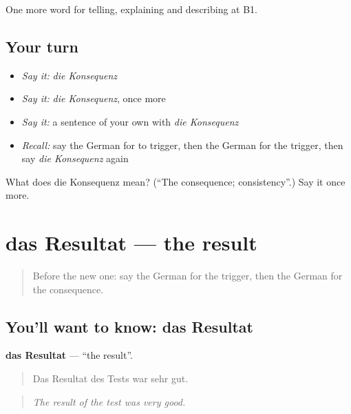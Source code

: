 \begin{grammarlens}[title={What you've built}]
One more word for telling, explaining and describing at B1.
\end{grammarlens}

\subsection*{Your turn}
\begin{itemize}
\raggedright
  \item \emph{Say it:} \emph{die Konsequenz}
  \item \emph{Say it:} \emph{die Konsequenz}, once more
  \item \emph{Say it:} a sentence of your own with \emph{die Konsequenz}
  \item \emph{Recall:} say the German for to trigger, then the German for the trigger, then say \emph{die Konsequenz} again
\end{itemize}

\begin{tcolorbox}[breakable,colback=teal!4,colframe=teal!35!black,title={Before you move on}]
What does die Konsequenz mean? (\textquotedblleft{}The consequence; consistency\textquotedblright{}.) Say it once more.
\end{tcolorbox}
\section[das Resultat]{das Resultat — the result}

\label{lesson:GE-C343-resultat}



\begin{quote}
Before the new one: say the German for the trigger, then the German for the consequence.
\end{quote}

\subsection*{You'll want to know: das Resultat}
\textbf{das Resultat} — \textquotedblleft{}the result\textquotedblright{}.

\begin{quote}
Das Resultat des Tests war sehr gut.
\end{quote}

\begin{quote}
\emph{The result of the test was very good.}
\end{quote}

